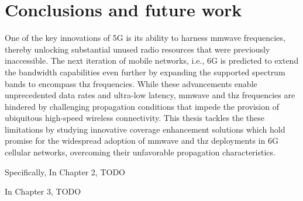 \chapter{Conclusions and future work}

One of the key innovations of 5G is its ability to harness \gls{mmwave} frequencies, thereby unlocking substantial unused radio resources that were previously inaccessible. The next iteration of mobile networks, i.e., 6G is predicted to extend the bandwidth capabilities even further by expanding the supported spectrum bands to encompass \gls{thz} frequencies. 
While these advancements enable unprecedented data rates and ultra-low latency, \gls{mmwave} and \gls{thz} frequencies are hindered by challenging propagation conditions that impede the provision of ubiquitous high-speed wireless connectivity.
This thesis tackles the these limitations by studying innovative coverage enhancement solutions which hold promise for the widespread adoption of \gls{mmwave} and \gls{thz} deployments in 6G cellular networks, overcoming their unfavorable propagation characteristics.

Specifically, In Chapter 2, TODO

In Chapter 3, TODO

